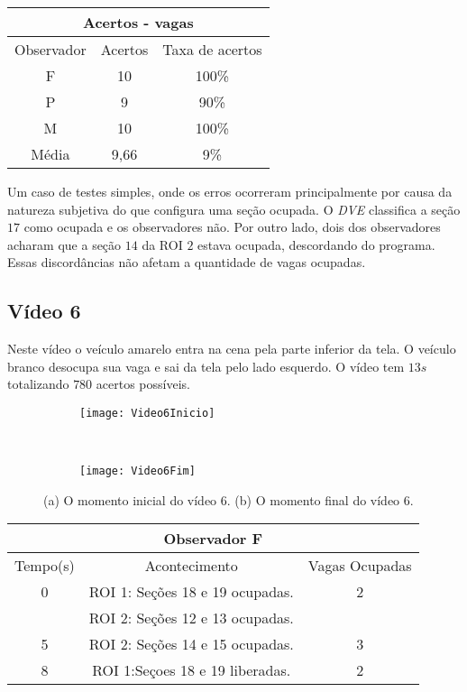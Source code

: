 \begin{center}
\begin{tabular}{|c||c||c|}
\hline
\multicolumn{3}{|c|}{Acertos - vagas}  \\ \hline \hline
Observador & Acertos & Taxa de acertos \\ \hline
F & 10 & 100\% \\  \hline
P & 9 & 90\% \\ \hline
M & 10 & 100\% \\ \hline
Média & 9,66 & 9\% \\
\hline
\end{tabular}
\end{center}


Um caso de testes simples, onde os erros ocorreram principalmente por causa da natureza subjetiva do que configura uma seção ocupada. O \textit{DVE} classifica a seção $17$ como ocupada e os observadores não. Por outro lado, dois dos observadores acharam que a seção $14$ da ROI $2$ estava ocupada, descordando do programa. Essas discordâncias não afetam a quantidade de vagas ocupadas.

\subsection{Vídeo 6}

Neste vídeo o veículo amarelo entra na cena pela parte inferior da tela. O veículo branco desocupa sua vaga e sai da tela pelo lado esquerdo. O vídeo tem $13s$ totalizando $780$ acertos possíveis.

\begin{figure}[!h]
\centering
\begin{subfigure}{.5\textwidth}
\centering
\texttt{[image: Video6Inicio]}
\caption{}
\end{subfigure}\
\begin{subfigure}{.5\textwidth}
\centering
\texttt{[image: Video6Fim]}
\caption{}
\end{subfigure}
\centering
\caption{(a) O momento inicial do vídeo 6. (b) O momento final do vídeo 6.}%
\label{}%
\end{figure}

\begin{center}
\begin{tabular}{|c||c||c|}
\hline
\multicolumn{3}{|c|}{Observador F}  \\ \hline \hline
Tempo(s) & Acontecimento & Vagas Ocupadas \\ \hline
0 & ROI 1: Seções 18 e 19 ocupadas. & 2 \\
 & ROI 2: Seções 12 e 13 ocupadas. &  \\ \hline
5 & ROI 2: Seções 14 e 15 ocupadas. & 3 \\ \hline
8 & ROI 1:Seçoes 18 e 19 liberadas. & 2 \\
\hline
\end{tabular}
\end{center}

